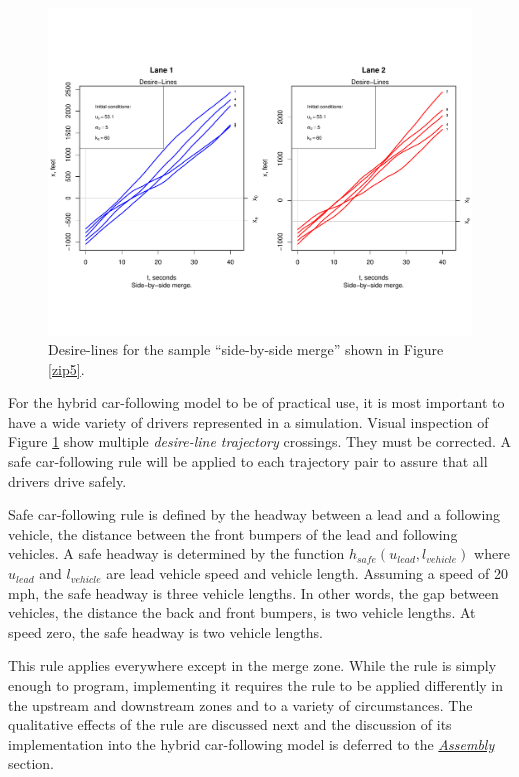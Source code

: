 \documentclass[Proceedings]{ascelike}
\begin{document}
\begin{figure}
\centering
\includegraphics[width = 5.5in]{Rplot10.pdf}
\caption{Desire-lines for the sample  ``side-by-side merge'' shown in Figure \ref{zip5}.}
\label{desire5}
\end{figure}


For the hybrid car-following model to be of practical use, it is  most important to have a wide variety of drivers represented in a simulation.   Visual inspection  of Figure \ref{desire5} show multiple  \emph{desire-line trajectory} crossings. They must be corrected. A safe car-following rule  will be applied to each  trajectory pair to assure that all drivers drive safely. 

Safe car-following rule is defined by the headway between a lead and a following vehicle, the distance between the front bumpers of the lead and following vehicles. A safe headway is determined by the function $h_{safe}(u_{lead}, l_{vehicle})$ where $u_{lead}$ and $l_{vehicle}$ are lead vehicle speed and vehicle length. Assuming a  speed of 20 mph, the safe headway is three vehicle lengths. In other words, the gap between vehicles, the distance the back and front bumpers,  is two vehicle lengths. At speed zero, the safe headway is two vehicle lengths.

This rule applies everywhere except in the  merge zone. While the rule is simply enough to program, implementing it requires the rule to be applied differently in the upstream and downstream zones and to a variety of circumstances. The qualitative effects of the rule are discussed next and the discussion of its implementation into the hybrid car-following model is deferred to the \underline{\emph{Assembly}} section. 
\end{document}
